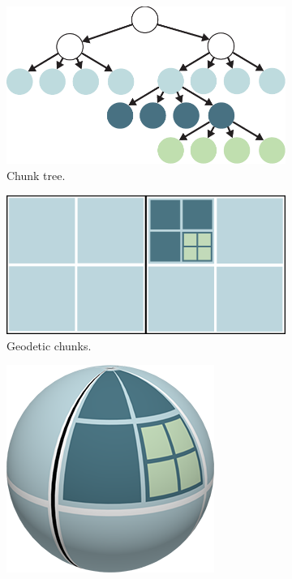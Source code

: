 \begin{figure}[htbp]
    \centering
    \begin{subfigure}[b]{0.3\textwidth}
        \includegraphics[width=\textwidth]{figures/chunkedlod/chunkedlodtree.pdf}
        \caption{Chunk tree.}
    \end{subfigure}
    \quad
    \begin{subfigure}[b]{0.3\textwidth}
        \includegraphics[width=\textwidth]{figures/chunkedlod/tiled.png}
        \caption{Geodetic chunks.}
    \end{subfigure}
    \quad
    \begin{subfigure}[b]{0.2\textwidth}
        \includegraphics[width=\textwidth]{figures/chunkedlod/tiled_globe.png}

\end{subfigure}
\end{figure}
